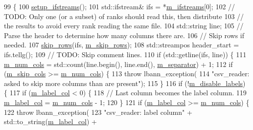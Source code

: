\begin{DoxyCode}
99                       \{
100   \hyperlink{classlbann_1_1csv__reader_afc689f206192339770ee9fbd132492bb}{setup\_ifstreams}();
101   std::ifstream& ifs = *\hyperlink{classlbann_1_1csv__reader_a41ede08dd2ed420bf8f6c6670d892caf}{m\_ifstreams}[0];
102   \textcolor{comment}{// TODO: Only one (or a subset) of ranks should read this, then distribute}
103   \textcolor{comment}{// the results to avoid every rank reading the same file.}
104   std::string line;
105   \textcolor{comment}{// Parse the header to determine how many columns there are.}
106   \textcolor{comment}{// Skip rows if needed.}
107   \hyperlink{classlbann_1_1csv__reader_ace1c71ad266e6bd85573051ff45277ab}{skip\_rows}(ifs, \hyperlink{classlbann_1_1csv__reader_a52b9eebd06309a8d8858ce74ecd8cce0}{m\_skip\_rows});
108   std::streampos header\_start = ifs.tellg();
109   \textcolor{comment}{// TODO: Skip comment lines.}
110   \textcolor{keywordflow}{if} (std::getline(ifs, line)) \{
111     \hyperlink{classlbann_1_1csv__reader_a7607d3f6b356538671147a0b8f7b09c8}{m\_num\_cols} = std::count(line.begin(), line.end(), \hyperlink{classlbann_1_1csv__reader_abab4a731daa751856f083c117ac8862a}{m\_separator}) + 1;
112     \textcolor{keywordflow}{if} (\hyperlink{classlbann_1_1csv__reader_a3a6cb698fbeb4abd0032e2b018bbb326}{m\_skip\_cols} >= \hyperlink{classlbann_1_1csv__reader_a7607d3f6b356538671147a0b8f7b09c8}{m\_num\_cols}) \{
113       \textcolor{keywordflow}{throw} lbann\_exception(
114         \textcolor{stringliteral}{"csv\_reader: asked to skip more columns than are present"});
115     \}
116     \textcolor{keywordflow}{if} (!\hyperlink{classlbann_1_1csv__reader_a5f013485fc1466dcf1f78ef020b845d4}{m\_disable\_labels}) \{
117       \textcolor{keywordflow}{if} (\hyperlink{classlbann_1_1csv__reader_acc02e56c81421c4507f7178ca8461b04}{m\_label\_col} < 0) \{
118         \textcolor{comment}{// Last column becomes the label column.}
119         \hyperlink{classlbann_1_1csv__reader_acc02e56c81421c4507f7178ca8461b04}{m\_label\_col} = \hyperlink{classlbann_1_1csv__reader_a7607d3f6b356538671147a0b8f7b09c8}{m\_num\_cols} - 1;
120       \}
121       \textcolor{keywordflow}{if} (\hyperlink{classlbann_1_1csv__reader_acc02e56c81421c4507f7178ca8461b04}{m\_label\_col} >= \hyperlink{classlbann_1_1csv__reader_a7607d3f6b356538671147a0b8f7b09c8}{m\_num\_cols}) \{
122         \textcolor{keywordflow}{throw} lbann\_exception(
123           \textcolor{stringliteral}{"csv\_reader: label column"} + std::to\_string(\hyperlink{classlbann_1_1csv__reader_acc02e56c81421c4507f7178ca8461b04}{m\_label\_col}) +

\end{DoxyCode}
